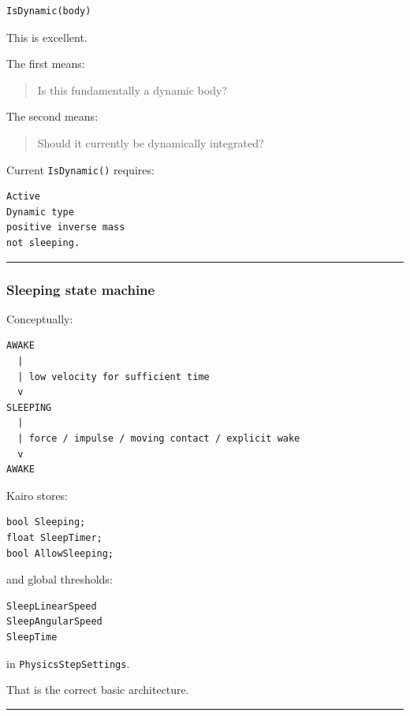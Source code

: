 \begin{verbatim}
IsDynamic(body)
\end{verbatim}

This is excellent.

The first means:

\begin{quote}
Is this fundamentally a dynamic body?
\end{quote}

The second means:

\begin{quote}
Should it currently be dynamically integrated?
\end{quote}

Current \texttt{IsDynamic()} requires:

\begin{verbatim}
Active
Dynamic type
positive inverse mass
not sleeping.
\end{verbatim}

\begin{center}\rule{0.5\linewidth}{0.5pt}\end{center}

\subsubsection{Sleeping state machine}\label{sleeping-state-machine}

Conceptually:

\begin{verbatim}
AWAKE
  |
  | low velocity for sufficient time
  v
SLEEPING
  |
  | force / impulse / moving contact / explicit wake
  v
AWAKE
\end{verbatim}

Kairo stores:

\begin{verbatim}
bool Sleeping;
float SleepTimer;
bool AllowSleeping;
\end{verbatim}

and global thresholds:

\begin{verbatim}
SleepLinearSpeed
SleepAngularSpeed
SleepTime
\end{verbatim}

in \texttt{PhysicsStepSettings}.

That is the correct basic architecture.

\begin{center}\rule{0.5\linewidth}{0.5pt}\end{center}

